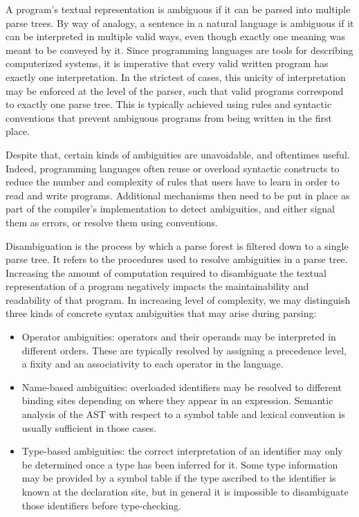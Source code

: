 
A program's textual representation is ambiguous if it can be parsed into multiple parse trees.
By way of analogy, a sentence in a natural language is ambiguous if it can be interpreted in multiple valid ways, even though exactly one meaning was meant to be conveyed by it.
Since programming languages are tools for describing computerized systems, it is imperative that every valid written program has exactly one interpretation.
In the strictest of cases, this unicity of interpretation may be enforced at the level of the parser, such that valid programs correspond to exactly one parse tree.
This is typically achieved using rules and syntactic conventions that prevent ambiguous programs from being written in the first place.

Despite that, certain kinds of ambiguities are unavoidable, and oftentimes useful.
Indeed, programming languages often reuse or overload syntactic constructs to reduce the number and complexity of rules that users have to learn in order to read and write programs.
Additional mechanisms then need to be put in place as part of the compiler's implementation to detect ambiguities, and either signal them as errors, or resolve them using conventions.


Disambiguation is the process by which a parse forest is filtered down to a single parse tree.
It refers to the procedures used to resolve ambiguities in a parse tree.
Increasing the amount of computation required to disambiguate the textual representation of a program negatively impacts the maintainability and readability of that program.
In increasing level of complexity, we may distinguish three kinds of concrete syntax ambiguities that may arise during parsing:
\begin{itemize}
\item
Operator ambiguities: operators and their operands may be interpreted in different orders.
These are typically resolved by assigning a precedence level, a fixity and an associativity to each operator in the language.
\item
Name-based ambiguities: overloaded identifiers may be resolved to different binding sites depending on where they appear in an expression.
Semantic analysis of the \ac{AST} with respect to a symbol table and lexical convention is usually sufficient in those cases.
\item
Type-based ambiguities: the correct interpretation of an identifier may only be determined once a type has been inferred for it.
Some type information may be provided by a symbol table if the type ascribed to the identifier is known at the declaration site, but in general it is impossible to disambiguate those identifiers before type-checking.
\end{itemize}


